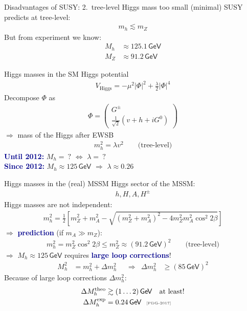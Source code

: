 \documentclass[hyperref={pdfpagelabels=false},ngerman]{beamer}
\newcommand{\eh}[1]{\,\mathsf{#1}}
\newcommand{\mycite}[1]{\ensuremath{\text{\textcolor{darkgray}{\tiny [#1]}}}}
\renewcommand{\emph}[1]{\textbf{\textcolor{darkblue}{#1}}}
\newcommand{\GeV}{\eh{GeV}}
\begin{document}
\begin{frame}{Disadvantages of SUSY: 2.\ tree-level Higgs mass too small}
  (minimal) SUSY predicts at tree-level:
  \begin{align*}
    m_h \lesssim m_Z
  \end{align*}
  But from experiment we know:
  \begin{align*}
    M_h &\approx 125.1 \GeV \\
    M_Z &\approx 91.2 \GeV
  \end{align*}
\end{frame}

\begin{frame}{Higgs masses in the SM}
  Higgs potential
  \begin{align*}
    V_{\text{Higgs}} = -\mu^2 |\Phi|^2 + \frac{\lambda}{2}|\Phi|^4
  \end{align*}
  Decompose $\Phi$ as
  \begin{align*}
    \Phi =
    \begin{pmatrix}
      G^\pm \\ \frac{1}{\sqrt{2}} (v + h + i G^0)
    \end{pmatrix}
  \end{align*}
  $\Rightarrow$ mass of the Higgs after EWSB
  \begin{align*}
    m_h^2 = \lambda v^2  \qquad \text{(tree-level)}
  \end{align*}
  \emph{Until 2012:} $M_h =\ ?$ $\Leftrightarrow$ $\lambda =\ ?$\\
  \emph{Since 2012:} $M_h \approx 125\eh{GeV}$ $\Rightarrow$ $\lambda \approx 0.26$
\end{frame}

\begin{frame}{Higgs masses in the (real) MSSM}
  Higgs sector of the MSSM:
  \begin{align*}
    h, H, A, H^\pm
  \end{align*}
  Higgs masses are not independent:
  \begin{align*}
    m_h^2 = \frac{1}{2} \left[
      m_Z^2 + m_A^2 - \sqrt{(m_Z^2 + m_A^2)^2 - 4 m_Z^2 m_A^2 \cos^2{2\beta}}
    \right]
  \end{align*}
  $\Rightarrow$ \emph{prediction} (if $m_A \gg m_Z$):
  \begin{align*}
    m_h^2 = m_Z^2 \cos^2{2\beta}
    \leq m_Z^2
    \approx (91.2 \eh{GeV})^2  \qquad \text{(tree-level)}
  \end{align*}
  $\Rightarrow$ $M_h \approx 125\eh{GeV}$ requires \emph{large loop
    corrections}!
  \begin{align*}
    M_h^2 &= m_h^2 + \Delta m_h^2
    & &\Rightarrow &
    \Delta m_h^2 &\geq (85\eh{GeV})^2
  \end{align*}
  Because of large loop corrections $\Delta m_h^2$:
  \begin{align*}
    \Delta M_h^{\text{theo}} &\gtrsim (1\ldots 2)\eh{GeV} \quad \text{at least!} \\
    \Delta M_h^{\text{exp}} &= 0.24\eh{GeV} \ \ \mycite{PDG-2017}
  \end{align*}
\end{frame}
\end{document}
